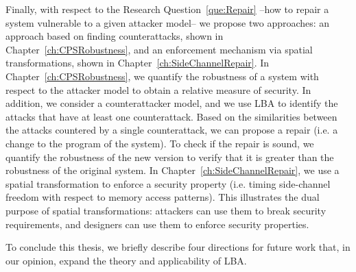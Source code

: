 Finally, with respect to the Research Question~\ref{que:Repair} --how to repair a system vulnerable to a given attacker model-- we propose two approaches: an approach based on finding counterattacks, shown in Chapter~\ref{ch:CPSRobustness}, and an enforcement mechanism via spatial transformations, shown in Chapter~\ref{ch:SideChannelRepair}. In Chapter~\ref{ch:CPSRobustness}, we quantify the robustness of a system with respect to the attacker model to obtain a relative measure of security. In addition, we consider a counterattacker model, and we use LBA to identify the attacks that have at least one counterattack. Based on the similarities between the attacks countered by a single counterattack, we can propose a repair (i.e. a change to the program of the system). To check if the repair is sound, we quantify the robustness of the new version to verify that it is greater than the robustness of the original system. In Chapter~\ref{ch:SideChannelRepair}, we use a spatial transformation to enforce a security property (i.e. timing side-channel freedom with respect to memory access patterns). This illustrates the dual purpose of spatial transformations: attackers can use them to break security requirements, and designers can use them to enforce security properties. 

To conclude this thesis, we briefly describe four directions for future work that, in our opinion, expand the theory and applicability of LBA.




     
